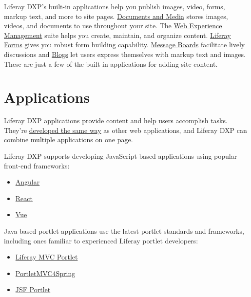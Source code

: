 Liferay DXP's built-in applications help you publish images, video,
forms, markup text, and more to site pages.
\href{/docs/7-2/user/-/knowledge_base/u/managing-documents-and-media}{Documents
and Media} stores images, videos, and documents to use throughout your
site. The
\href{/docs/7-2/user/-/knowledge_base/u/web-experience-management}{Web
Experience Management} suite helps you create, maintain, and organize
content. \href{/docs/7-2/user/-/knowledge_base/u/forms}{Liferay Forms}
gives you robust form building capability.
\href{/docs/7-2/user/-/knowledge_base/u/creating-forums-with-message-boards}{Message
Boards} facilitate lively discussions and
\href{/docs/7-2/user/-/knowledge_base/u/publishing-blogs}{Blogs} let
users express themselves with markup text and images. These are just a
few of the built-in applications for adding site content.

\section{Applications}\label{applications}

Liferay DXP applications provide content and help users accomplish
tasks. They're
\href{/7-2/appdev/-/knowledge_base/a/web-front-ends}{developed the same
way} as other web applications, and Liferay DXP can combine multiple
applications on one page.

Liferay DXP supports developing JavaScript-based applications using
popular front-end frameworks:

\begin{itemize}
\tightlist
\item
  \href{/docs/7-2/appdev/-/knowledge_base/a/developing-an-angular-application}{Angular}
\item
  \href{/docs/7-2/appdev/-/knowledge_base/a/developing-a-react-application}{React}
\item
  \href{/docs/7-2/appdev/-/knowledge_base/a/developing-a-vue-application}{Vue}
\end{itemize}

Java-based portlet applications use the latest portlet standards and
frameworks, including ones familiar to experienced Liferay portlet
developers:

\begin{itemize}
\tightlist
\item
  \href{/docs/7-2/appdev/-/knowledge_base/a/liferay-mvc-portlet}{Liferay
  MVC Portlet}
\item
  \href{/docs/7-2/appdev/-/knowledge_base/a/portletmvc4spring}{PortletMVC4Spring}
\item
  \href{/docs/7-2/appdev/-/knowledge_base/a/jsf-portlet}{JSF Portlet}
\end{itemize}

